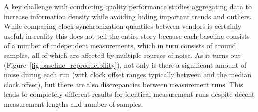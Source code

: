 A key challenge with conducting quality performance studies aggregating data to increase information density while avoiding hiding important trends and outliers. While comparing clock-synchronization quantiles between vendors is certainly useful, in reality this does not tell the entire story because each baseline consists of a number of independent measurements, which in turn consists of around \numSamplesPerRunApprox{} samples, all of which are affected by multiple sources of noise. As it turns out (Figure~\ref{fig:baseline_reproducibility}), not only is there a significant amount of noise during each run (with clock offset ranges typically between \fRatio{\cmpMin} and \fRatio{\cmpMax} the median clock offset), but there are also discrepancies between measurement runs. This leads to completely different results for identical measurement runs despite decent measurement lengths and number of samples.


